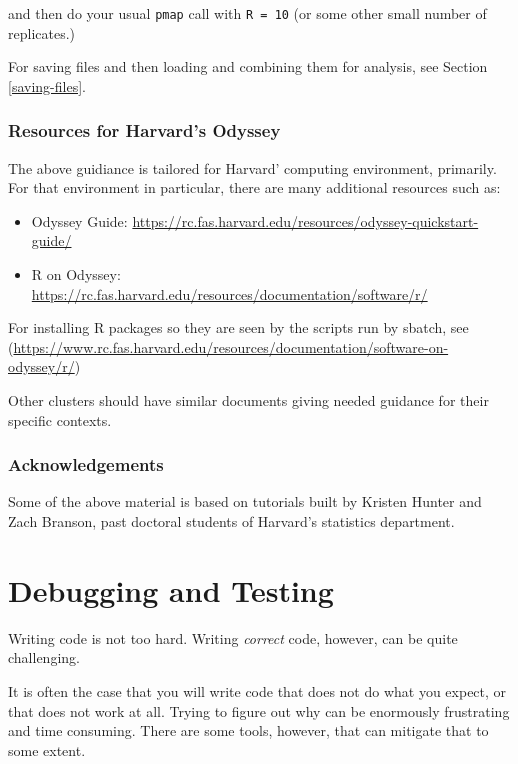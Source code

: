 \documentclass[
]{book}
\providecommand{\tightlist}{%
  \setlength{\itemsep}{0pt}\setlength{\parskip}{0pt}}
\begin{document}
and then do your usual \texttt{pmap} call with \texttt{R\ =\ 10} (or some other small number of replicates.)

For saving files and then loading and combining them for analysis, see Section \ref{saving-files}.

\subsection{Resources for Harvard's Odyssey}\label{resources-for-harvards-odyssey}

The above guidiance is tailored for Harvard' computing environment, primarily.
For that environment in particular, there are many additional resources such as:

\begin{itemize}
\tightlist
\item
  Odyssey Guide: \url{https://rc.fas.harvard.edu/resources/odyssey-quickstart-guide/}
\item
  R on Odyssey: \url{https://rc.fas.harvard.edu/resources/documentation/software/r/}
\end{itemize}

For installing R packages so they are seen by the scripts run by sbatch, see (\url{https://www.rc.fas.harvard.edu/resources/documentation/software-on-odyssey/r/})

Other clusters should have similar documents giving needed guidance for their specific contexts.

\subsection{Acknowledgements}\label{acknowledgements-1}

Some of the above material is based on tutorials built by Kristen Hunter and Zach Branson, past doctoral students of Harvard's statistics department.

\chapter{Debugging and Testing}\label{debugging-and-testing}

Writing code is not too hard.
Writing \emph{correct} code, however, can be quite challenging.

It is often the case that you will write code that does not do what you expect, or that does not work at all.
Trying to figure out why can be enormously frustrating and time consuming.
There are some tools, however, that can mitigate that to some extent.
\end{document}
